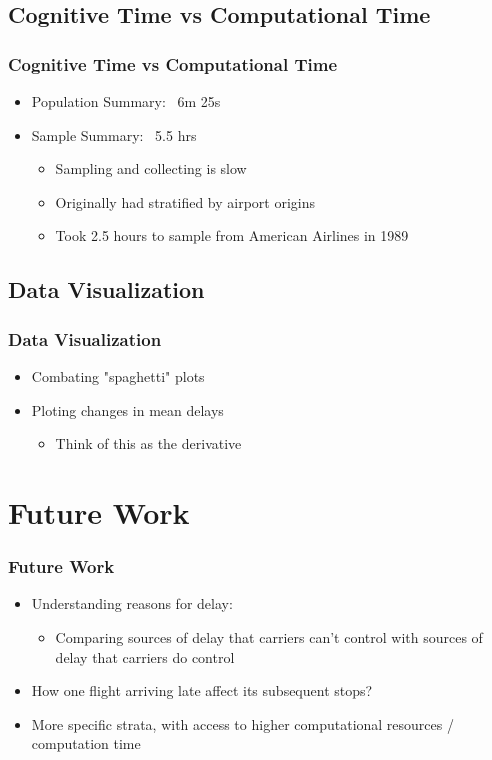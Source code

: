 \documentclass{beamer}
\begin{document}
\subsection{Cognitive Time vs Computational Time}
\begin{frame}
\frametitle{Cognitive Time vs Computational Time}
\begin{itemize}
\item Population Summary: ~6m 25s
\item Sample Summary: ~5.5 hrs 
\begin{itemize}
\item Sampling and collecting is slow 
\item Originally had stratified by airport origins 
\item Took 2.5 hours to sample from American Airlines in 1989
\end{itemize}
\end{itemize}

\end{frame}

\subsection{Data Visualization}
\begin{frame}
\frametitle{Data Visualization}
\begin{itemize}
\item Combating "spaghetti" plots
\item Ploting changes in mean delays 
\begin{itemize}
\item Think of this as the derivative 
\end{itemize}
\end{itemize}

\end{frame}

\section{Future Work}
\begin{frame}
\frametitle{Future Work}
\begin{itemize}
\item Understanding reasons for delay: 
\begin{itemize}
\item Comparing sources of delay that carriers can't control with sources of delay that carriers do control 
\end{itemize}
\item How one flight arriving late affect its subsequent stops? 
\item More specific strata, with access to higher computational resources / computation time
\end{itemize}

\end{frame}
\end{document}
